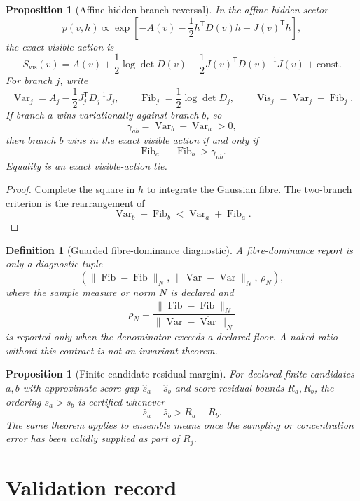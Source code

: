 \documentclass[11pt,a4paper]{article}
\numberwithin{equation}{section}
\theoremstyle{thmcompact}
\newtheorem{proposition}[theorem]{Proposition}
\newtheorem{definition}[theorem]{Definition}
\theoremstyle{remark}
\begin{document}
\begin{proposition}[Affine-hidden branch reversal]
\label{prop:affine-branch-reversal}
In the affine-hidden sector
\[
p(v,h)\propto
\exp\!\left[-A(v)-\frac12h^{\mathsf T}D(v)h-J(v)^{\mathsf T}h\right],
\]
the exact visible action is
\[
S_{\mathrm{vis}}(v)
=
A(v)+\frac12\log\det D(v)-\frac12J(v)^{\mathsf T}D(v)^{-1}J(v)+\mathrm{const}.
\]
For branch $j$, write
\[
\operatorname{Var}_j=A_j-\frac12J_j^{\mathsf T}D_j^{-1}J_j,\qquad
\operatorname{Fib}_j=\frac12\log\det D_j,\qquad
\operatorname{Vis}_j=\operatorname{Var}_j+\operatorname{Fib}_j.
\]
If branch $a$ wins variationally against branch $b$, so
\[
\gamma_{ab}=\operatorname{Var}_b-\operatorname{Var}_a>0,
\]
then branch $b$ wins in the exact visible action if and only if
\[
\operatorname{Fib}_a-\operatorname{Fib}_b>\gamma_{ab}.
\]
Equality is an exact visible-action tie.
\end{proposition}

\begin{proof}
Complete the square in $h$ to integrate the Gaussian fibre. The two-branch criterion is the rearrangement of
\[
\operatorname{Var}_b+\operatorname{Fib}_b
<
\operatorname{Var}_a+\operatorname{Fib}_a.
\]
\end{proof}

\begin{definition}[Guarded fibre-dominance diagnostic]
A fibre-dominance report is only a diagnostic tuple
\[
\left(
\|\operatorname{Fib}-\overline{\operatorname{Fib}}\|_N,\,
\|\operatorname{Var}-\overline{\operatorname{Var}}\|_N,\,
\rho_N
\right),
\]
where the sample measure or norm $N$ is declared and
\[
\rho_N=
\frac{\|\operatorname{Fib}-\overline{\operatorname{Fib}}\|_N}
{\|\operatorname{Var}-\overline{\operatorname{Var}}\|_N}
\]
is reported only when the denominator exceeds a declared floor. A naked ratio without this contract is not an invariant theorem.
\end{definition}

\begin{proposition}[Finite candidate residual margin]
For declared finite candidates $a,b$ with approximate score gap $\widehat s_a-\widehat s_b$ and score residual bounds $R_a,R_b$, the ordering $s_a>s_b$ is certified whenever
\[
\widehat s_a-\widehat s_b>R_a+R_b.
\]
The same theorem applies to ensemble means once the sampling or concentration error has been validly supplied as part of $R_j$.
\end{proposition}

\section{Validation record}
\end{document}
